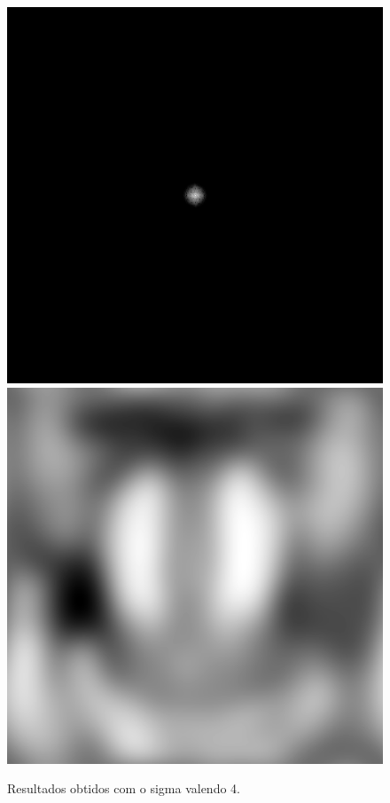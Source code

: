 \documentclass[twoside,twocolumn]{article}
\begin{document}
\begin{figure}[H]
\begin{center}
	\includegraphics[scale=.17]{figures/baboon_mag_filter_4.png}
	\includegraphics[scale=.17]{figures/baboon_result_4.png}
\caption{Resultados obtidos com o sigma valendo 4.} \label{mag_4}
\end{center}
\end{figure}
\end{document}

